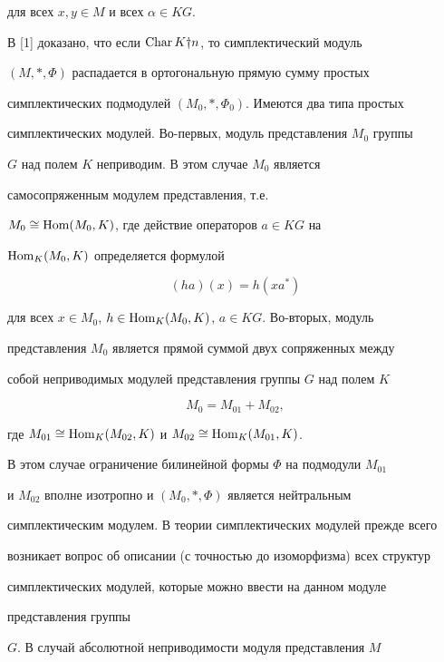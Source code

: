 для всех $x,y\in M$ и всех $\alpha\in KG$.





В [1] доказано, что если $\operatorname{Char} K\dag n$, то симплектический модуль


$(M,*,\Phi)$ распадается в ортогональную прямую сумму простых


симплектических подмодулей $(M_0,*,\Phi_0)$. Имеются два типа простых


симплектических модулей. Во-первых, модуль представления $M_0$ группы


$G$ над полем $K$ неприводим. В этом случае $M_0$ является


самосопряженным модулем представления, т.е.


$M_0\cong\operatorname{Hom}(M_0,K)$, где действие операторов $a\in KG$ на


$\operatorname{Hom}_K(M_0,K)$ определяется формулой


\begin{equation}


(ha)(x)=h(xa^*)


\end{equation}


для всех $x\in M_0$, $h\in\operatorname{Hom}_K(M_0,K)$, $a\in KG$. Во-вторых, модуль


представления $M_0$ является прямой суммой двух сопряженных между


собой неприводимых модулей представления группы $G$ над полем $K$


\begin{equation}


M_0=M_{01}+M_{02},


\end{equation}


где $M_{01}\cong\operatorname{Hom}_K(M_{02},K)$ и $M_{02}\cong\operatorname{Hom}_K(M_{01},K)$.


В этом случае ограничение билинейной формы $\Phi$ на подмодули $M_{01}$


и $M_{02}$ вполне изотропно и $(M_0,*,\Phi)$ является нейтральным


симплектическим модулем. В теории симплектических модулей прежде всего


возникает вопрос об описании (с точностью до изоморфизма) всех структур


симплектических модулей, которые можно ввести на данном модуле


представления группы


$G$. В случай абсолютной неприводимости модуля представления $M$


